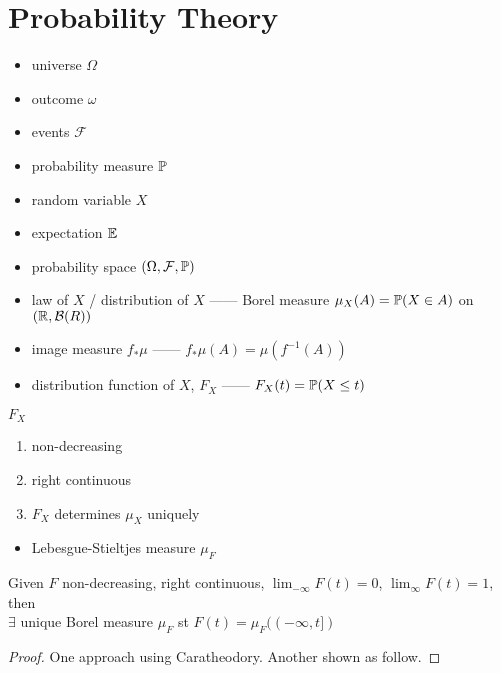 \section{Probability Theory}\label{sec:probability-theory}

\begin{itemize}
    \item universe $\Omega$
    \item outcome $\omega$
    \item events $\mathcal{F}$
    \item probability measure $\mathbb{P}$
    \item random variable $X$
    \item expectation $\mathbb{E}$
    \item probability space $(\Omega, \mathcal{F}, \mathbb{P})$
    \item law of $X$ / distribution of $X$ ------ Borel measure $\mu_X(A) = \mathbb{P}(X \in A)$ on $(\mathbb{R}, \mathcal{B}(R))$
    \item image measure $f_*\mu$ ------ $f_*\mu(A) = \mu(f^{-1}(A))$
    \item distribution function of $X$, $F_X$ ------ $F_X(t) = \mathbb{P}(X \leq t)$
\end{itemize}

\begin{prop}
    $F_X$
    \begin{enumerate}
        \item non-decreasing
        \item right continuous
        \item $F_X$ determines $\mu_X$ uniquely
    \end{enumerate}
\end{prop}

\begin{itemize}
    \item Lebesgue-Stieltjes measure $\mu_F$
\end{itemize}

\begin{prop}
    Given $F$ non-decreasing, right continuous, $\lim_{-\infty} F(t) = 0$, $\lim_{\infty} F(t) = 1$, then \\
    $\exists$ unique Borel measure $\mu_F$ st $F(t) = \mu_F((-\infty, t])$
\end{prop}

\begin{proof}
    One approach using Caratheodory.
    Another shown as follow.
\end{proof}

